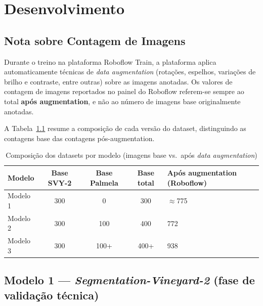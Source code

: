 \chapter{Desenvolvimento}
\label{chap:desenvolvimento}

\section*{Nota sobre Contagem de Imagens}

Durante o treino na plataforma Roboflow Train, a plataforma aplica
automaticamente técnicas de \textit{data augmentation} (rotações,
espelhos, variações de brilho e contraste, entre outras) sobre as
imagens anotadas. Os valores de contagem de imagens reportados no
painel do Roboflow referem-se sempre ao total \textbf{após
augmentation}, e não ao número de imagens base originalmente anotadas.

A Tabela~\ref{tab:datasets_aug} resume a composição de cada versão
do dataset, distinguindo as contagens base das contagens pós-augmentation.

\begin{table}[H]
  \centering
  \caption{Composição dos datasets por modelo (imagens base vs.\
           após \textit{data augmentation})}
  \label{tab:datasets_aug}
  \begin{tabularx}{\textwidth}{l c c c X}
    \toprule
    \textbf{Modelo} & \textbf{Base SVY-2} & \textbf{Base Palmela}
                    & \textbf{Base total} & \textbf{Após augmentation (Roboflow)} \\
    \midrule
    Modelo 1 & 300 & 0   & 300  & $\approx$775 \\
    Modelo 2 & 300 & 100 & 400  & 772 \\
    Modelo 3 & 300 & 100+ & 400+ & 938 \\
    \bottomrule
  \end{tabularx}
\end{table}

\section{Modelo 1 — \textit{Segmentation-Vineyard-2} (fase de validação técnica)}


